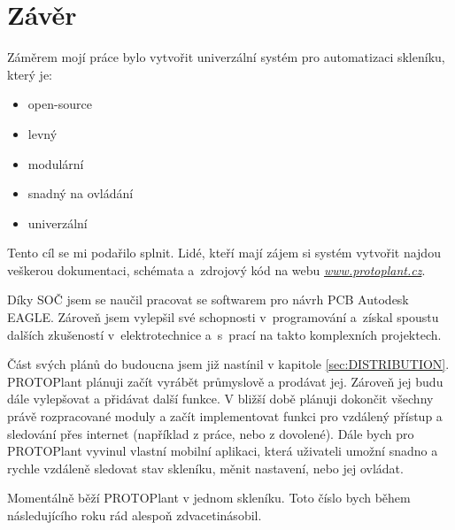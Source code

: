 \chapter*{Závěr}
Záměrem mojí práce bylo vytvořit univerzální systém pro automatizaci skle\-ní\-ku, který je:
\begin{itemize}
    \item open-source
    \item levný
    \item modulární
    \item snadný na ovládání
    \item univerzální
\end{itemize}

Tento cíl se mi podařilo splnit.
Lidé, kteří mají zájem si systém vytvořit najdou veškerou dokumentaci, schémata a~zdrojový kód na webu \textit{\url{www.protoplant.cz}}.

Díky SOČ jsem se naučil pracovat se softwarem pro návrh PCB Autodesk EAGLE.
Zároveň jsem vylepšil své schopnosti v~programování a~získal spoustu dalších zkušeností v~elektrotechnice a~s~prací na takto komplexních projektech.

Část svých plánů do budoucna jsem již nastínil v kapitole \ref{sec:DISTRIBUTION}.
PROTOPlant plánuji začít vyrábět průmyslově a prodávat jej.
Zároveň jej budu dále vylepšovat a přidávat další funkce.
V bližší době plánuji dokončit všechny právě rozpracované moduly a začít implementovat funkci pro vzdálený přístup a sledování přes internet (například z práce, nebo z dovolené).
Dále bych pro PROTOPlant vyvinul vlastní mobilní aplikaci, která uživateli umožní snadno a rychle vzdáleně sledovat stav skleníku, měnit nastavení, nebo jej ovládat.

Momentálně běží PROTOPlant v jednom skleníku. 
Toto číslo bych během následujícího roku rád alespoň zdvacetinásobil. 

\newpage
